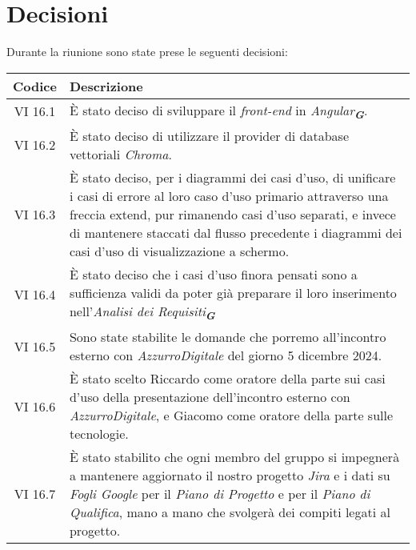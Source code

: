 
\section{Decisioni}

Durante la riunione sono state prese le seguenti decisioni:

\vspace{0.5cm}

\begin{table}[htbp]
    \centering
    \begin{tabular}{|c|p{}|}
        \hline
        \rowcolor[gray]{0.75}
        \textbf{Codice} & \textbf{Descrizione}\\
        \hline
        VI 16.1 & È stato deciso di sviluppare il \emph{front-end} in \emph{Angular}\textsubscript{\textit{\textbf{G}}}. \\
        \hline
        VI 16.2 & È stato deciso di utilizzare il provider di database vettoriali \emph{Chroma}. \\
        \hline
        VI 16.3 & È stato deciso, per i diagrammi dei casi d'uso, di unificare i casi di errore al loro caso d'uso primario attraverso una freccia extend,
        pur rimanendo casi d'uso separati, e invece di mantenere staccati dal flusso precedente i diagrammi dei casi d'uso di visualizzazione a schermo. \\
        \hline
        VI 16.4 & È stato deciso che i casi d'uso finora pensati sono a sufficienza validi da poter già preparare il loro inserimento nell'\emph{Analisi dei Requisiti}\textsubscript{\textit{\textbf{G}}} \\
        \hline
        VI 16.5 & Sono state stabilite le domande che porremo all'incontro esterno con \emph{AzzurroDigitale} del giorno 5 dicembre 2024. \\
        \hline
        VI 16.6 & È stato scelto Riccardo come oratore della parte sui casi d'uso della presentazione dell'incontro esterno con
        \emph{AzzurroDigitale}, e Giacomo come oratore della parte sulle tecnologie. \\
        \hline
        VI 16.7 & È stato stabilito che ogni membro del gruppo si impegnerà a mantenere aggiornato il nostro progetto \emph{Jira} e i dati su 
        \emph{Fogli Google} per il \emph{Piano di Progetto} e per il \emph{Piano di Qualifica}, mano a mano che svolgerà dei compiti legati al progetto. \\
        \hline
    \end{tabular}
\end{table}
